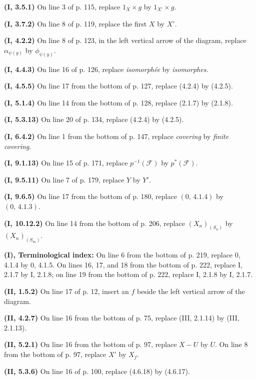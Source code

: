 \documentclass[10pt,oneside]{book}
\newcommand{\sh}[1]{\mathscr{#1}}
\newcommand{\vphi}{\phi}
\newcommand{\oldpage}[2][]{\setcounter{footnote}{0}\marginpar{\scriptsize\textbf{#1}~|~#2}\ignorespaces}
\begin{document}
\noindent\textbf{(I, 3.5.1)} On line 3 of p. 115, replace $1_X\times g$ by
$1_{X'}\times g$.

\noindent\textbf{(I, 3.7.2)} On line 8 of p. 119, replace the first $X$ by
$X'$.

\noindent\textbf{(I, 4.2.2)} On line 8 of p. 123, in the left vertical arrow
of the diagram, replace $\alpha_{\psi(y)}$ by $\vphi_{\psi(y)}$.

\noindent\textbf{(I, 4.4.3)} On line 16 of p. 126, replace \emph{isomorphée}
by \emph{isomorphes}.

\noindent\textbf{(I, 4.5.5)} On line 17 from the bottom of p. 127, replace
(4.2.4) by (4.2.5).

\noindent\textbf{(I, 5.1.4)} On line 14 from the bottom of p. 128, replace
(2.1.7) by (2.1.8).

\noindent\textbf{(I, 5.3.13)} On line 20 of p. 134, replace (4.2.4) by
(4.2.5).

\noindent\textbf{(I, 6.4.2)} On line 1 from the bottom of p. 147, replace
\emph{covering} by \emph{finite covering}.

\noindent\textbf{(I, 9.1.13)} On line 15 of p. 171, replace
$p^{-1}(\sh{F})$ by $p^*(\sh{F})$.

\noindent\textbf{(I, 9.5.11)} On line 7 of p. 179, replace $Y$ by $Y'$.

\noindent\textbf{(I, 9.6.5)} On line 17 from the bottom of p. 180, replace
$(0,\,4.1.4)$ by $(0,\,4.1.3)$.

\noindent\textbf{(I, 10.12.2)} On line 14 from the bottom of p. 206, replace
$(X_n)_{(S_n)}$ by $(X_n)_{(S_m)}$.

\clearpage
\oldpage[III]{218}
\noindent\textbf{(I), Terminological index:} On line 6 from the bottom of p.
219, replace 0, 4.1.4 by 0, 4.1.5. On lines 16, 17, and 18 from the bottom of
p. 222, replace I, 2.1.7 by I, 2.1.8; on line 19 from the bottom of p. 222,
replace I, 2.1.8 by I, 2.1.7.

\noindent\textbf{(II, 1.5.2)} On line 17 of p. 12, insert an $f$ beside the
left vertical arrow of the diagram.

\noindent\textbf{(II, 4.2.7)} On line 16 from the bottom of p. 75, replace
(III, 2.1.14) by (III, 2.1.13).

\noindent\textbf{(II, 5.2.1)} On line 16 from the bottom of p. 97, replace
$X-U$ by $U$. On line 8 from the bottom of p. 97, replace $X'$ by $X_f$.

\noindent\textbf{(II, 5.3.6)} On line 16 of p. 100, replace (4.6.18) by
(4.6.17).
\end{document}
